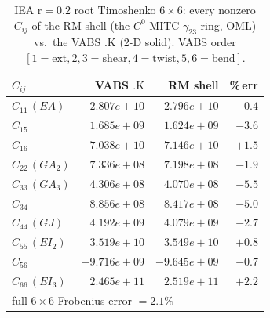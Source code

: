 \begin{table}[htpb]\centering\small
\caption{IEA r$=0.2$ root Timoshenko $6\times6$: every nonzero $C_{ij}$ of the RM shell (the $C^0$ MITC-$\gamma_{23}$ ring, OML) vs.\ the VABS $.\mathrm{K}$ (2-D solid). VABS order $[1\!=\!\mathrm{ext},2,3\!=\!\mathrm{shear},4\!=\!\mathrm{twist},5,6\!=\!\mathrm{bend}]$.}\label{tab:r020_homo}
\begin{tabular}{lrrr}
\toprule
$C_{ij}$ & VABS $.\mathrm{K}$ & RM shell & \%\,err \\
\midrule
$C_{11}\,(EA)$ & $2.807e+10$ & $2.796e+10$ & $-0.4$ \\
$C_{15}$ & $1.685e+09$ & $1.624e+09$ & $-3.6$ \\
$C_{16}$ & $-7.038e+10$ & $-7.146e+10$ & $+1.5$ \\
$C_{22}\,(GA_2)$ & $7.336e+08$ & $7.198e+08$ & $-1.9$ \\
$C_{33}\,(GA_3)$ & $4.306e+08$ & $4.070e+08$ & $-5.5$ \\
$C_{34}$ & $8.856e+08$ & $8.417e+08$ & $-5.0$ \\
$C_{44}\,(GJ)$ & $4.192e+09$ & $4.079e+09$ & $-2.7$ \\
$C_{55}\,(EI_2)$ & $3.519e+10$ & $3.549e+10$ & $+0.8$ \\
$C_{56}$ & $-9.716e+09$ & $-9.645e+09$ & $-0.7$ \\
$C_{66}\,(EI_3)$ & $2.465e+11$ & $2.519e+11$ & $+2.2$ \\
\midrule
\multicolumn{4}{l}{\small full-$6\times6$ Frobenius error $=2.1\%$} \\
\bottomrule
\end{tabular}
\end{table}